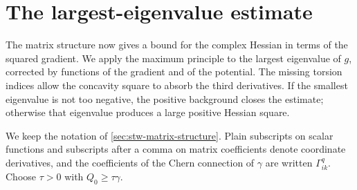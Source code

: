\section{The largest-eigenvalue estimate}
\label{sec:stw-second-order-proof}

The matrix structure now gives a bound for the complex Hessian in terms of the squared gradient. We apply the maximum principle to the largest eigenvalue of $g$, corrected by functions of the gradient and of the potential. The missing torsion indices allow the concavity square to absorb the third derivatives. If the smallest eigenvalue is not too negative, the positive background closes the estimate; otherwise that eigenvalue produces a large positive Hessian square.

We keep the notation of \cref{sec:stw-matrix-structure}. Plain subscripts on scalar functions and subscripts after a comma on matrix coefficients denote coordinate derivatives, and the coefficients of the Chern connection of $\gamma$ are written $\Gamma^q_{ik}$. Choose $\tau>0$ with $Q_0\geq\tau\gamma$.

